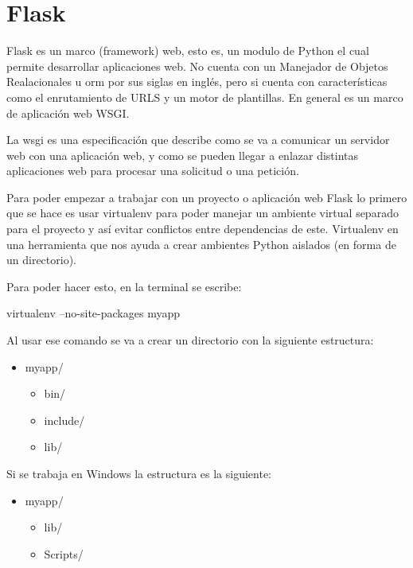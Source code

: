 \documentclass[12pt, a4paper, titlepage]{report}
\begin{document}
		\section{Flask}
		Flask es un marco (framework) web, esto es, un modulo de Python el cual permite desarrollar aplicaciones web. No cuenta con un Manejador de Objetos Realacionales u \acrshort{orm} por sus siglas en inglés, pero si cuenta con características como el enrutamiento de URLS y un motor de plantillas. En general es un marco de aplicación web WSGI.\cite{refFlask3}\par
		La \acrfull{wsgi} es una especificación que describe como se va a comunicar un servidor web con una aplicación web, y como se pueden llegar a enlazar distintas aplicaciones web para procesar una solicitud o una petición.\cite{refFlask2}\par
		Para poder empezar a trabajar con un proyecto o aplicación web Flask lo primero que se hace es usar virtualenv para poder manejar un ambiente virtual separado para el proyecto y así evitar conflictos entre dependencias de este. Virtualenv en una herramienta que nos ayuda a crear ambientes Python aislados (en forma de un directorio).\par
		Para poder hacer esto, en la terminal se escribe:\par
		\begin{center}
		virtualenv --no-site-packages myapp\par
		\end{center}
		Al usar ese comando se va a crear un directorio con la siguiente estructura:\par
		\begin{itemize}
		    \item myapp/
		    \begin{itemize}
		        \item bin/
		        \item include/
		        \item lib/
		    \end{itemize}
		\end{itemize}
		Si se trabaja en Windows la estructura es la siguiente:\par
		\begin{itemize}
		    \item myapp/
		    \begin{itemize}
		        \item lib/
		        \item Scripts/
		    \end{itemize}
		\end{itemize}
\end{document}
